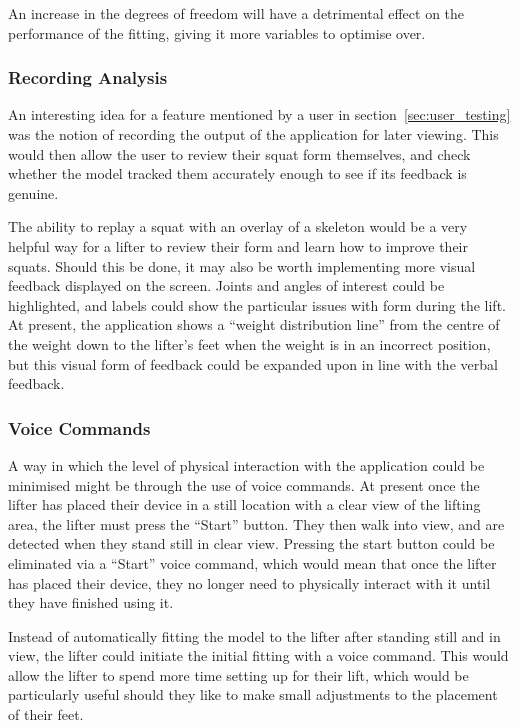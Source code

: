 An increase in the degrees of freedom will have a detrimental effect on the performance of the fitting, giving it more variables to optimise over.

\subsubsection{Recording Analysis}

An interesting idea for a feature mentioned by a user in section~\ref{sec:user_testing} was the notion of recording the output of the application for later viewing. This would then allow the user to review their squat form themselves, and check whether the model tracked them accurately enough to see if its feedback is genuine.

The ability to replay a squat with an overlay of a skeleton would be a very helpful way for a lifter to review their form and learn how to improve their squats. Should this be done, it may also be worth implementing more visual feedback displayed on the screen. Joints and angles of interest could be highlighted, and labels could show the particular issues with form during the lift. At present, the application shows a ``weight distribution line'' from the centre of the weight down to the lifter's feet when the weight is in an incorrect position, but this visual form of feedback could be expanded upon in line with the verbal feedback.

\subsubsection{Voice Commands}

A way in which the level of physical interaction with the application could be minimised might be through the use of voice commands. At present once the lifter has placed their device in a still location with a clear view of the lifting area, the lifter must press the ``Start'' button. They then walk into view, and are detected when they stand still in clear view. Pressing the start button could be eliminated via a ``Start'' voice command, which would mean that once the lifter has placed their device, they no longer need to physically interact with it until they have finished using it.

Instead of automatically fitting the model to the lifter after standing still and in view, the lifter could initiate the initial fitting with a voice command. This would allow the lifter to spend more time setting up for their lift, which would be particularly useful should they like to make small adjustments to the placement of their feet.

